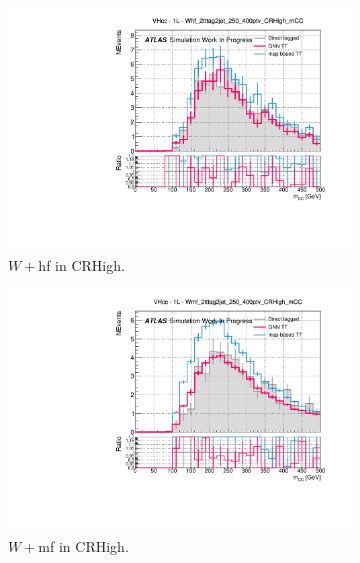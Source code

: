 \begin{figure}[h!]
  \begin{subfigure}[b]{0.32\textwidth}
    \includegraphics[width=\textwidth]{Images/VH/Tagging/Whf_2tttag2jet_250_400ptv_CRHigh_mCC.pdf}
  \caption{$W+$hf in CRHigh.} 
  \end{subfigure}
  \begin{subfigure}[b]{0.32\textwidth}
    \includegraphics[width=\textwidth]{Images/VH/Tagging/Wmf_2tttag2jet_250_400ptv_CRHigh_mCC.pdf}
    \caption{$W+$mf in CRHigh.}
  \end{subfigure}
  \begin{subfigure}[b]{0.32\textwidth}

\end{subfigure}
\end{figure}
